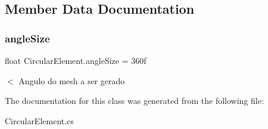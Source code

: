 \subsection{Member Data Documentation}
\mbox{\label{class_circular_element_a9442a4ccbffb0581a724e1fb1cdea53f}} 
\subsubsection{\texorpdfstring{angle\+Size}{angleSize}}
{\footnotesize\ttfamily float Circular\+Element.\+angle\+Size = 360f}

$<$ Angulo do mesh a ser gerado 

The documentation for this class was generated from the following file\+:\begin{DoxyCompactItemize}
\item 
Circular\+Element.\+cs\end{DoxyCompactItemize}
